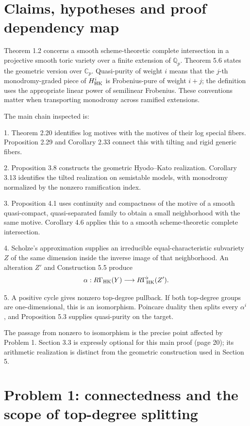 \documentclass[10pt]{article}
\begin{document}
\section*{Claims, hypotheses and proof dependency map}
Theorem 1.2 concerns a smooth scheme-theoretic complete intersection in a projective smooth toric variety over a finite extension of \(\mathbb Q_p\). Theorem 5.6 states the geometric version over \(\mathbb C_p\). Quasi-purity of weight \(i\) means that the \(j\)-th monodromy-graded piece of \(H^i_{\rm HK}\) is Frobenius-pure of weight \(i+j\); the definition uses the appropriate linear power of semilinear Frobenius. These conventions matter when transporting monodromy across ramified extensions.\par
The main chain inspected is:\par
1. Theorem 2.20 identifies log motives with the motives of their log special fibers. Proposition 2.29 and Corollary 2.33 connect this with tilting and rigid generic fibers.\par
2. Proposition 3.8 constructs the geometric Hyodo–Kato realization. Corollary 3.13 identifies the tilted realization on semistable models, with monodromy normalized by the nonzero ramification index.\par
3. Proposition 4.1 uses continuity and compactness of the motive of a smooth quasi-compact, quasi-separated family to obtain a small neighborhood with the same motive. Corollary 4.6 applies this to a smooth scheme-theoretic complete intersection.\par
4. Scholze’s approximation supplies an irreducible equal-characteristic subvariety \(Z\) of the same dimension inside the inverse image of that neighborhood. An alteration \(Z'\) and Construction 5.5 produce \[\alpha:R\Gamma_{\rm HK}(Y)\longrightarrow
 R\Gamma_{\rm HK}^{\flat}(Z').\]\par
5. A positive cycle gives nonzero top-degree pullback. If both top-degree groups are one-dimensional, this is an isomorphism. Poincare duality then splits every \(\alpha^i\), and Proposition 5.3 supplies quasi-purity on the target.\par
The passage from nonzero to isomorphism is the precise point affected by Problem 1. Section 3.3 is expressly optional for this main proof (page 20); its arithmetic realization is distinct from the geometric construction used in Section 5.\par
\section*{Problem 1: connectedness and the scope of top-degree splitting}
\end{document}
